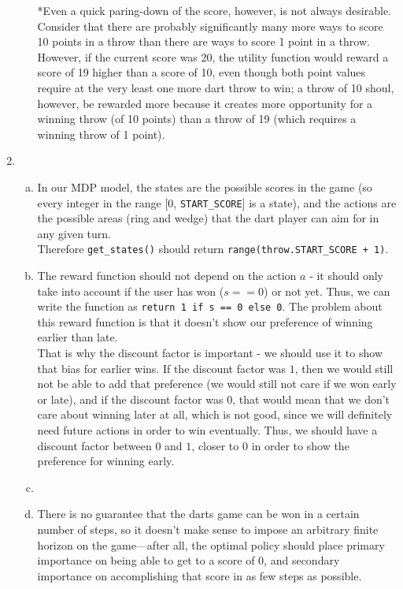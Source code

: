\documentclass{article}
\begin{document}
\begin{enumerate}
\begin{enumerate}[(a)]
                *Even a quick paring-down of the score, however, is not always desirable. Consider that there are probably significantly many more ways to score 10 points in a throw than there are ways to score 1 point in a throw. However, if the current score was 20, the utility function would reward a score of 19 higher than a score of 10, even though both point values require at the very least one more dart throw to win; a throw of 10 shoul, however, be rewarded more because it creates more opportunity for a winning throw (of 10 points) than a throw of 19 (which requires a winning throw of 1 point).
            \end{enumerate}
        \item
            \begin{enumerate}[(a)]
                \item In our MDP model, the states are the possible scores in the game (so every integer in the range [0, \texttt{START\_SCORE}] is a state), and the actions are the possible areas (ring and wedge) that the dart player can aim for in any given turn. \\

                Therefore \texttt{get\_states()} should return \texttt{range(throw.START\_SCORE + 1)}.

                \item The reward function should not depend on the action $a$ - it should only take into account if the user has won ($s==0$) or not yet.  Thus, we can write the function as \texttt{return 1 if s == 0 else 0}. The problem about this reward function is that it doesn't show our preference of winning earlier than late.\\
                
                That is why the discount factor is important - we should use it to show that bias for earlier wins. If the discount factor was $1$, then we would still not be able to add that preference (we would still not care if we won early or late), and if the discount factor was $0$, that would mean that we don't care about winning later at all, which is not good, since we will definitely need future actions in order to win eventually. Thus, we should have a discount factor between $0$ and $1$, closer to $0$ in order to show the preference for winning early.

                \item %
                
                \item There is no guarantee that the darts game can be won in a certain number of steps, so it doesn't make sense to impose an arbitrary finite horizon on the game---after all, the optimal policy should place primary importance on being able to get to a score of 0, and secondary importance on accomplishing that score in as few steps as possible.
                

\end{enumerate}
\end{enumerate}
\end{document}
